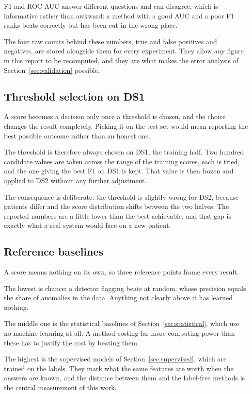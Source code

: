 \documentclass[a4paper, 12pt]{article}
\begin{document}
F1 and ROC AUC answer different questions and can disagree, which is informative
rather than awkward: a method with a good AUC and a poor F1 ranks beats correctly
but has been cut in the wrong place.

The four raw counts behind these numbers, true and false positives and negatives,
are stored alongside them for every experiment. They allow any figure in this
report to be recomputed, and they are what makes the error analysis of
Section~\ref{sec:validation} possible.


\subsection{Threshold selection on DS1}\label{subsec:threshold}

A score becomes a decision only once a threshold is chosen, and the choice changes
the result completely. Picking it on the test set would mean reporting the best
possible outcome rather than an honest one.

The threshold is therefore always chosen on DS1, the training half. Two hundred
candidate values are taken across the range of the training scores, each is tried,
and the one giving the best F1 on DS1 is kept. That value is then frozen and
applied to DS2 without any further adjustment.

The consequence is deliberate: the threshold is slightly wrong for DS2, because
patients differ and the score distribution shifts between the two halves. The
reported numbers are a little lower than the best achievable, and that gap is
exactly what a real system would face on a new patient.

\subsection{Reference baselines}\label{subsec:baselines}

A score means nothing on its own, so three reference points frame every result.

The lowest is chance: a detector flagging beats at random, whose precision equals
the share of anomalies in the data. Anything not clearly above it has learned
nothing.

The middle one is the statistical baselines of Section~\ref{sec:statistical},
which use no machine learning at all. A method costing far more computing power
than these has to justify the cost by beating them.

The highest is the supervised models of Section~\ref{sec:supervised}, which are
trained on the labels. They mark what the same features are worth when the answers
are known, and the distance between them and the label-free methods is the central
measurement of this work.
\end{document}
